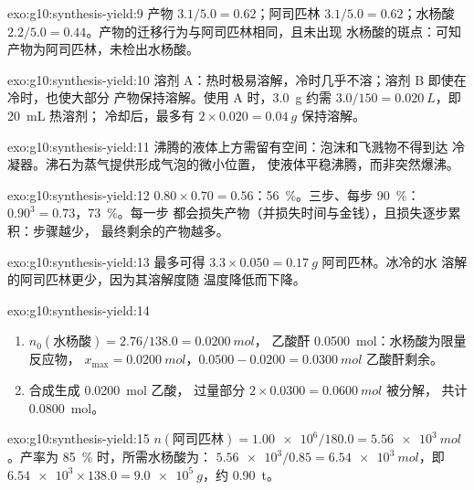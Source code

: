 \begin{solution}{exo:g10:synthesis-yield:9}
产物 $3.1/5.0 = 0.62$；阿司匹林 $3.1/5.0 = 0.62$；水杨酸
$2.2/5.0 = 0.44$。产物的迁移行为与阿司匹林相同，且未出现
水杨酸的斑点：可知产物为阿司匹林，未检出水杨酸。
\end{solution}

\begin{solution}{exo:g10:synthesis-yield:10}
溶剂 A：热时极易溶解，冷时几乎不溶；溶剂 B 即使在冷时，也使大部分
产物保持溶解。使用 A 时，\qty{3.0}{g} 约需
$3.0 / 150 = \qty{0.020}{L}$，即 \qty{20}{mL} 热溶剂；
冷却后，最多有 $2 \times 0.020 = \qty{0.04}{g}$ 保持溶解。
\end{solution}

\begin{solution}{exo:g10:synthesis-yield:11}
沸腾的液体上方需留有空间：泡沫和飞溅物不得到达
冷凝器。沸石为蒸气提供形成气泡的微小位置，
使液体平稳沸腾，而非突然爆沸。
\end{solution}

\begin{solution}{exo:g10:synthesis-yield:12}
$0.80 \times 0.70 = 0.56$：\qty{56}{\percent}。三步、每步
\qty{90}{\percent}：$0.90^3 = 0.73$，\qty{73}{\percent}。每一步
都会损失产物（并损失时间与金钱），且损失逐步累积：步骤越少，
最终剩余的产物越多。
\end{solution}

\begin{solution}{exo:g10:synthesis-yield:13}
最多可得 $3.3 \times 0.050 = \qty{0.17}{g}$ 阿司匹林。冰冷的水
溶解的阿司匹林更少，因为其溶解度随
温度降低而下降。
\end{solution}

\begin{solution}{exo:g10:synthesis-yield:14}
\begin{enumerate}
  \item $n_0(\text{水杨酸}) = 2.76 / 138.0 = \qty{0.0200}{mol}$，
        乙酸酐 \qty{0.0500}{mol}：水杨酸为限量反应物，
        $x_{\max} = \qty{0.0200}{mol}$，$0.0500 - 0.0200 =
        \qty{0.0300}{mol}$ 乙酸酐剩余。
  \item 合成生成 \qty{0.0200}{mol} 乙酸，
        过量部分 $2 \times 0.0300 = \qty{0.0600}{mol}$ 被分解，
        共计 \qty{0.0800}{mol}。
\end{enumerate}
\end{solution}

\begin{solution}{exo:g10:synthesis-yield:15}
$n(\text{阿司匹林}) = \num{1.00e6} / 180.0 = \qty{5.56e3}{mol}$。产率为
\qty{85}{\percent} 时，所需水杨酸为：
$\num{5.56e3} / 0.85 = \qty{6.54e3}{mol}$，即
$\num{6.54e3} \times 138.0 = \qty{9.0e5}{g}$，约 \qty{0.90}{t}。
\end{solution}


